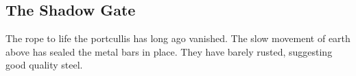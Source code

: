 \subsection{The Shadow Gate}


The rope to life the portcullis has long ago vanished.
The slow movement of earth above has sealed the metal bars in place.
They have barely rusted, suggesting good quality steel.





